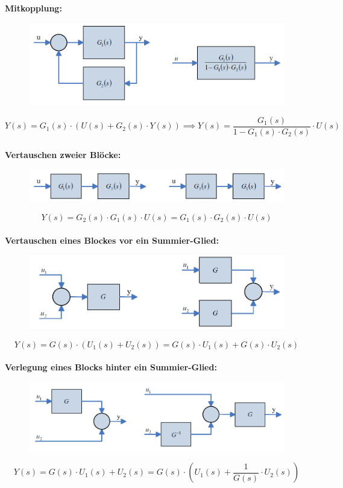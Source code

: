 \documentclass[10pt,a4paper]{article}
\begin{document}
\textbf{Mitkopplung:}
\begin{figure}[H]
	\includegraphics[width = \columnwidth]{imgs/mitkopplung.png}
\end{figure}
$$
	Y(s) = G_1(s) ⋅ (U(s) + G_2(s) ⋅ Y(s)) \implies Y(s) = \frac{G_1(s)}{1 - G_1(s) ⋅ G_2(s)} ⋅ U(s)
$$ \\

\textbf{Vertauschen zweier Blöcke:}
\begin{figure}[H]
	\includegraphics[width = \columnwidth]{imgs/vertauschen_zweier_bloecke.png}
\end{figure}
$$
	Y(s) = G_2(s) ⋅ G_1(s) ⋅ U(s) = G_1(s) ⋅ G_2(s) ⋅ U(s)
$$ \\

\textbf{Vertauschen eines Blockes vor ein Summier-Glied:}
\begin{figure}[H]
	\includegraphics[width = \columnwidth]{imgs/vertauschen_block_vor_summierer.png}
\end{figure}
$$
	Y(s) = G(s) ⋅(U_1(s) + U_2(s)) = G(s) ⋅ U_1(s) + G(s) ⋅ U_2(s)
$$ \\

\textbf{Verlegung eines Blocks hinter ein Summier-Glied:}
\begin{figure}[H]
	\includegraphics[width = \columnwidth]{imgs/verlegung_block_hinter_summierer.png}
\end{figure}
$$
	Y(s) = G(s) ⋅U_1(s) + U_2(s) = G(s) ⋅ (U_1(s) + \frac{1}{G(s)} ⋅ U_2(s))
$$ \\
\end{document}
